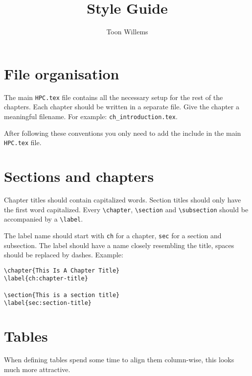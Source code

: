 \documentclass[11pt,a4paper]{article}
\title{Style Guide}
\author{Toon Willems}
\begin{document}
\maketitle

\section{File organisation}
\label{sec:file-organisation}

The main \texttt{HPC.tex} file contains all the necessary setup for the rest of
the chapters. Each chapter should be written in a separate file. Give the
chapter a meaningful filename. For example: \texttt{ch\_introduction.tex}.

After following these conventions you only need to add the include in the main
\texttt{HPC.tex} file.

\section{Sections and chapters}
\label{sec:sections-and-chapters}

Chapter titles should contain capitalized words. Section titles should only
have the first word capitalized. Every \texttt{\textbackslash{}chapter},
\texttt{\textbackslash{}section} and \texttt{\textbackslash{}subsection} should
be accompanied by a \texttt{\textbackslash{}label}.

The label name should start with \texttt{ch} for a chapter, \texttt{sec} for a
section and subsection. The label should have a name closely resembling the
title, spaces should be replaced by dashes. Example:

\begin{verbatim}
\chapter{This Is A Chapter Title}
\label{ch:chapter-title}

\section{This is a section title}
\label{sec:section-title}
\end{verbatim}

\section{Tables}
\label{sec:tables}

When defining tables spend some time to align them column-wise, this looks much more attractive.
\end{document}
